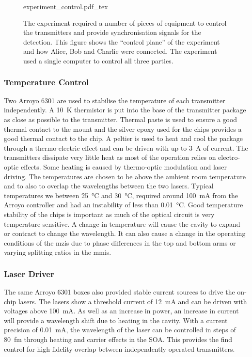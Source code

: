 \begin{figure}[t]
	\centering
	\large
	\def\svgwidth{\textwidth} 
	{experiment_control.pdf_tex}
	\caption[Control electronic schematic of the MDI-QKD experiment]{The experiment required a number of pieces of equipment to control the transmitters and provide synchronisation signals for the detection. This figure shows the ``control plane'' of the experiment and how Alice, Bob and Charlie were connected. The experiment used a single computer to control all three parties.}
	\label{fig:exp_control}
\end{figure}

\subsubsection*{Temperature Control}

Two Arroyo 6301 are used to stabilise the temperature of each transmitter independently. A \SI{10}{K} thermistor is put into the base of the transmitter package as close as possible to the transmitter. Thermal paste is used to ensure a good thermal contact to the mount and the silver epoxy used for the chips provides a good thermal contact to the chip. A peltier is used to heat and cool the package through a thermo-electric effect and can be driven with up to \SI{3}{A} of current. The transmitters dissipate very little heat as most of the operation relies on electro-optic effects. Some heating is caused by thermo-optic modulation and laser driving. The temperatures are chosen to be above the ambient room temperature and to also to overlap the wavelengths between the two lasers. Typical temperatures we between \SI{25}{\celsius} and \SI{30}{\celsius}, required around \SI{100}{mA} from the Arroyo controller and had an instability of less than \SI{0.01}{\celsius}. Good temperature stability of the chips is important as much of the optical circuit is very temperature sensitive. A change in temperature will cause the cavity to expand or contract to change the wavelength. It can also cause a change in the operating conditions of the \acp{mzi} due to phase differences in the top and bottom arms or varying splitting ratios in the \acp{mmi}.

\subsubsection*{Laser Driver}

The same Arroyo 6301 boxes also provided stable current sources to drive the on-chip lasers. The lasers show a threshold current of \SI{12}{mA} and can be driven with voltages above \SI{100}{mA}. As well as an increase in power, an increase in current will provide a wavelength shift due to heating in the cavity. With a current precision of \SI{0.01}{mA}, the wavelength of the laser can be controlled in steps of \SI{80}{fm} through heating and carrier effects in the \ac{SOA}. This provides the find control for high-fidelity overlap between independently operated transmitters. 


